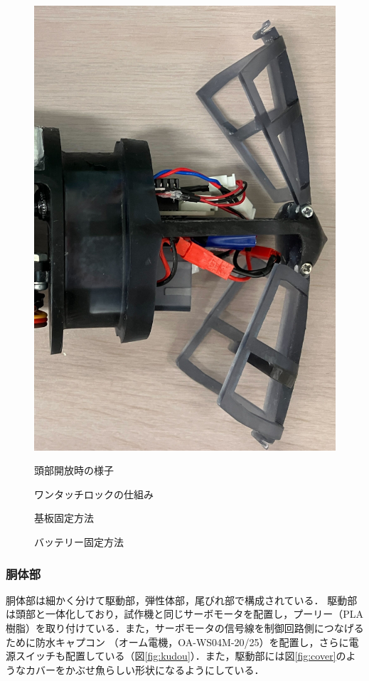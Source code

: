 \begin{figure}[t]
    \centering
    \begin{minipage}[b]{0.3\linewidth}
        \centering
        \includegraphics[width=0.6\linewidth]{chapters/picture/open_head.jpg}
        \caption{頭部開放時の様子}
        \label{fig:head_open}
    \end{minipage}
    \begin{minipage}[b]{0.5\linewidth}
        \centering
        \caption{ワンタッチロックの仕組み}
        \label{fig:rock}
    \end{minipage}
\end{figure}
\begin{figure}[t]
    \centering
    \begin{minipage}[b]{0.4\linewidth}
        \centering
        \caption{基板固定方法}
        \label{fig:toubu_kiban}
    \end{minipage}
    \hspace{0.1\linewidth}
    \begin{minipage}[b]{0.4\linewidth}
        \centering
        \caption{バッテリー固定方法}
        \label{fig:toubu_battery}
    \end{minipage}
\end{figure}

\subsubsection{胴体部}
胴体部は細かく分けて駆動部，弾性体部，尾びれ部で構成されている．
駆動部は頭部と一体化しており，試作機と同じサーボモータを配置し，プーリー（PLA樹脂）を取り付けている．また，サーボモータの信号線を制御回路側につなげるために防水キャプコン
（オーム電機，OA-WS04M-20/25）を配置し，さらに電源スイッチも配置している（図\ref{fig:kudou}）．また，駆動部には図\ref{fig:cover}のようなカバーをかぶせ魚らしい形状になるようにしている．

